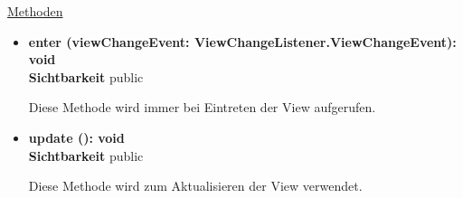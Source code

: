 \underline{Methoden}
\begin{itemize}
\itemsep0pt
\item \textbf{enter (viewChangeEvent: ViewChangeListener.ViewChangeEvent): void}\hfill\\
\textbf{Sichtbarkeit} public

Diese Methode wird immer bei Eintreten der View aufgerufen.

\item \textbf{update (): void}\hfill\\
\textbf{Sichtbarkeit} public

Diese Methode wird zum Aktualisieren der View verwendet.

\end{itemize}
